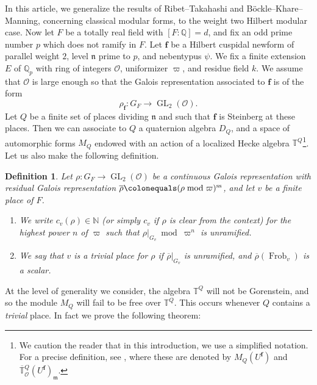 \documentclass[a4paper, notitlepage, 10pt]{amsart}
\theoremstyle{plain} %
\newtheorem*{undefinition}{Definition}
\theoremstyle{definition} %
\theoremstyle{remark} %
\numberwithin{equation}{section}
\newcommand{\bbN}{\mathbb N}
\newcommand{\bbQ}{\mathbb Q}
\newcommand{\bbT}{\mathbb T}
\newcommand{\GL}{\operatorname{GL}} %
\newcommand{\Frob}{\operatorname{Frob}} %
\begin{document}
In this article, we generalize the results of Ribet--Takahashi and Böckle--Khare--Manning, concerning classical modular forms, to the weight two Hilbert modular case. Now let $F$ be a totally real field with $[F:\mathbb{Q}]=d$, and fix an odd prime number $p$ which does not ramify in $F$. Let $\mathbf{f}$ be a Hilbert cuspidal newform of parallel weight $2$, level $\mathfrak{n}$ prime to $p$, and nebentypus $\psi$. We fix a finite extension $E$ of $\bbQ_p$ with ring of integers $\mathcal{O}$, uniformizer $\varpi$, and residue field $k$. We assume that $\mathcal{O}$ is large enough so that the Galois representation associated to $\mathbf{f}$ is of the form
$$ \rho_{\mathbf{f}}\colon G_F \longrightarrow \GL_2(\mathcal{O}). $$
Let $Q$ be a finite set of places dividing $\mathfrak{n}$ and such that $\mathbf{f}$ is Steinberg at these places. Then we can associate to $Q$ a quaternion algebra $D_Q$, and a space of automorphic forms $M_Q$ endowed with an action of a localized Hecke algebra $\bbT^{Q}$\footnote{We caution the reader that in this introduction, we use a simplified notation. For a precise definition, see , where these are denoted by $M_Q(U^{\mathbf{f}})$ and $\overline{\bbT}{}^Q_{\mathcal{O}}(U^{\mathbf{f}})_{\mathfrak{m}}$.}. Let us also make the following definition.
\begin{undefinition}
    Let $\rho\colon G_F\to \GL_2(\mathcal{O})$ be a continuous Galois representation with residual Galois representation $\overline{\rho}\colonequals(\rho\bmod \varpi)^{\text{ss}}$,  and let $v$ be a finite place of $F$.
    \begin{enumerate}
        \item[1.] We write $c_v(\rho)\in \bbN$ (or simply $c_v$ if $\rho$ is clear from the context) for the highest power $n$ of $\varpi$ such that $\rho|_{G_v}\bmod \varpi^n$ is unramified.
        \item[2.] We say that $v$ is a trivial place for $\rho$ if $\overline{\rho}|_{G_v} $ is unramified, and $\overline{\rho}(\Frob_v)$ is a scalar.
    \end{enumerate}
\end{undefinition}



At the level of generality we consider, the algebra $\bbT^{Q}$ will not be Gorenstein, and so the module $M_Q$ will fail to be free over $\bbT^{Q}$. This occurs whenever $Q$ contains a \emph{trivial} place. 
In fact we prove the following theorem:
\end{document}
